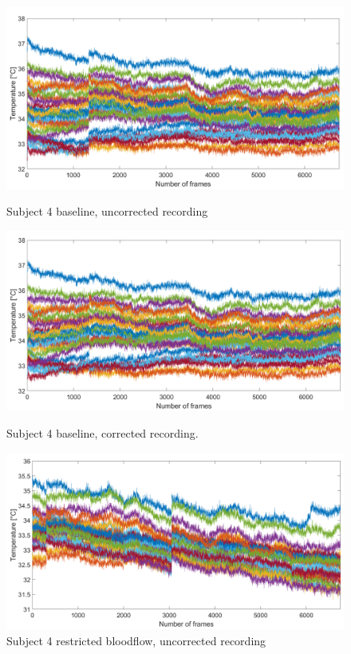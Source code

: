 \begin{figure}[htbp]
	\begin{minipage}[b]{0.45\linewidth}
		\centering
		\includegraphics[width=\linewidth]{figures/Recordings/Sub4_uncuffed_uncorr}
		\caption{Subject 4 baseline, uncorrected recording}
	
	\end{minipage}
	\hspace{0.2cm}
	\begin{minipage}[b]{0.45\linewidth}
		\centering
		\includegraphics[width=\linewidth]{figures/Recordings/Sub4_uncuffed_corr}
		\caption{Subject 4 baseline, corrected recording.}
	
	\end{minipage}
	\hspace{0.2cm}
	\begin{minipage}[b]{0.45\linewidth}
		\centering
		\includegraphics[width=\linewidth]{figures/Recordings/Sub4_cuffed_uncorr}
		\caption{Subject 4 restricted bloodflow, uncorrected recording}
	

\end{minipage}
\end{figure}
